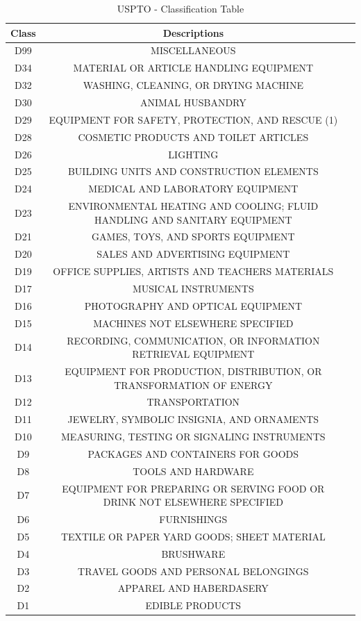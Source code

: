 \documentclass{sig-alternate}
\begin{document}
{\begin{table}
\begin{tabular}{|c|c|l|} \hline
 Class & Descriptions \\ \hline
D99 & MISCELLANEOUS \\ \hline
D34 & MATERIAL OR ARTICLE HANDLING EQUIPMENT\\ \hline
D32 & WASHING, CLEANING, OR DRYING MACHINE\\ \hline
D30 & ANIMAL HUSBANDRY\\ \hline
D29 & EQUIPMENT FOR SAFETY, PROTECTION, AND RESCUE (1)\\ \hline
D28 & COSMETIC PRODUCTS AND TOILET ARTICLES\\ \hline
D26 & LIGHTING\\ \hline
D25 & BUILDING UNITS AND CONSTRUCTION ELEMENTS\\ \hline
D24 & MEDICAL AND LABORATORY EQUIPMENT\\ \hline
D23 & ENVIRONMENTAL HEATING AND COOLING; FLUID HANDLING AND SANITARY EQUIPMENT\\ \hline
D21 & GAMES, TOYS, AND SPORTS EQUIPMENT\\ \hline
D20 & SALES AND ADVERTISING EQUIPMENT\\ \hline
D19 & OFFICE SUPPLIES, ARTISTS AND TEACHERS MATERIALS\\ \hline
D17 & MUSICAL INSTRUMENTS\\ \hline
D16 & PHOTOGRAPHY AND OPTICAL EQUIPMENT\\ \hline
D15 & MACHINES NOT ELSEWHERE SPECIFIED\\ \hline
D14 & RECORDING, COMMUNICATION, OR INFORMATION RETRIEVAL EQUIPMENT\\ \hline
D13 & EQUIPMENT FOR PRODUCTION, DISTRIBUTION, OR TRANSFORMATION OF ENERGY\\ \hline
D12 & TRANSPORTATION\\ \hline
D11 & JEWELRY, SYMBOLIC INSIGNIA, AND ORNAMENTS\\ \hline
D10 & MEASURING, TESTING OR SIGNALING INSTRUMENTS\\ \hline
D9 & PACKAGES AND CONTAINERS FOR GOODS\\ \hline
D8& TOOLS AND HARDWARE \\ \hline
D7& EQUIPMENT FOR PREPARING OR SERVING FOOD OR DRINK NOT ELSEWHERE SPECIFIED \\ \hline
D6 & FURNISHINGS\\ \hline
D5 & TEXTILE OR PAPER YARD GOODS; SHEET MATERIAL\\ \hline
D4 & BRUSHWARE\\ \hline
D3 & TRAVEL GOODS AND PERSONAL BELONGINGS\\ \hline
D2 & APPAREL AND HABERDASERY\\ \hline
D1 & EDIBLE PRODUCTS\\ \hline
\end{tabular}
\centering
\caption{USPTO - Classification Table}
\end{table} 
 
}
\end{document}
